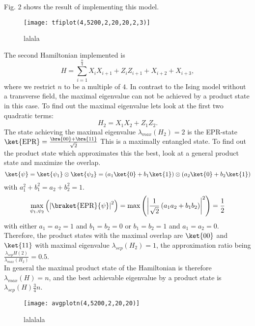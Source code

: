Fig. 2 shows the result of implementing this model.
\begin{figure}[H]
	\centering
	\texttt{[image: tfiplot(4,5200,2,20,20,2,3)]}
	\caption{lalala}
	\label{fig:2}
\end{figure}
The second Hamiltonian implemented is \[
	H = \sum_{i=1}^{\frac{n}{4}} X_iX_{i+1}+Z_iZ_{i+1}+X_{i+2}+X_{i+3},
\]
where we restrict $n$ to be a multiple of $4$.
In contrast to the Ising model without a transverse field, the maximal eigenvalue can not be achieved by a product state in this case.
To find out the maximal eigenvalue lets look at the first two quadratic terms:
\[
H_2=X_1X_2+Z_1Z_2
.\]
The state achieving the maximal eigenvalue $\lambda_{max}(H_2)=2$ is the EPR-state $\ket{\text{EPR}}=\frac{\bra{00}+\bra{11}}{\sqrt{2}}$
This is a maximally entangled state.
To find out the product state which approximates this the best, look at a general product state and maximize the overlap.
\[
	\ket{\psi}=\ket{\psi_1}\otimes\ket{\psi_2}=\left(a_1\ket{0}+b_1\ket{1}\right)\otimes\left(a_2\ket{0}+b_2\ket{1}\right)
\] with $a_1^2+b_1^2=a_2+b_2^2=1$.
\[
\max_{\psi_1,\psi_2}\left(\left|\braket{\text{EPR}}{\psi}\right|^2\right)=\max\left(\left|\frac{1}{\sqrt{2}}\left(a_1a_2+b_1b_2\right)\right|^2\right)=\frac{1}{2}
\]
with either $a_1=a_2=1$ and $b_1=b_2=0$ or $b_1=b_2=1$ and $a_1=a_2=0$.
Therefore, the product states with the maximal overlap are $\ket{00}$ and $\ket{11}$ with maximal eigenvalue $\lambda_{sep}(H_2)=1$, the approximation ratio being  $\frac{\lambda_{sep}H(2)}{\lambda_{max}(H_2)} = 0.5$.\\
In general the maximal product state of the Hamiltonian is therefore $\lambda_{max}(H)=n$, and the best achievable eigenvalue by a product state is $\lambda_{sep}(H)\frac{3}{4}n$.
\begin{figure}[H]
	\centering
	\texttt{[image: avgplotn(4,5200,2,20,20)]}
	\caption{lalalala}
	\label{fig:avgplotn}
\end{figure}
